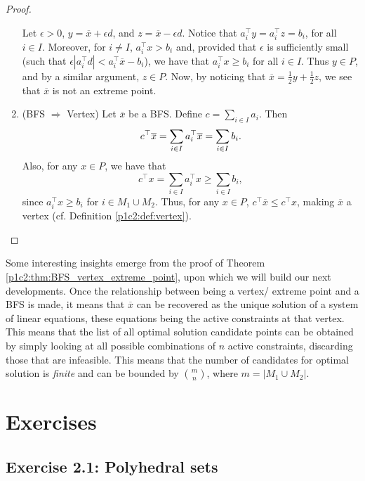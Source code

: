\begin{proof}
\begin{enumerate}
			Let $\epsilon > 0$, $y = \overline{x} + \epsilon d$, and $z = \overline{x} - \epsilon d$. Notice that $a_i^\top y = a_i^\top z = b_i$, for all $i \in I$. Moreover, for $i \neq I$, $a_i^\top x > b_i$ and, provided that $\epsilon$ is sufficiently small (such that $\epsilon|a_i^\top d| < a_i ^\top \overline{x} - b_i $), we have that $a_i ^\top x \geq b_i$ for all $i \in I$. Thus $y \in P$, and by a similar argument, $z \in P$. Now, by noticing that $\overline{x} = \frac{1}{2}y + \frac{1}{2}z$, we see that $\overline{x}$ is not an extreme point. 			 
		\item (BFS $\Rightarrow$ Vertex) Let $\overline{x}$ be a BFS. Define $c = \sum_{i \in I} a_i$. Then
			\begin{equation*}
				c^\top \overline{x} = \linebreak \sum_{i \in I} a_i^\top \overline{x} = \sum_{i \in I} b_i.	 			 	
	 		\end{equation*}
			Also, for any $x \in P$, we have that 
			\begin{equation*}
				c^\top x = \sum_{i \in I} a_i^\top x \geq \sum_{i \in I} b_i, 	 	
	 		\end{equation*}
	 		since $a_i^\top x \geq b_i$ for $i \in M_1 \cup M_2$. Thus, for any $x \in P$, $c^\top \overline{x} \leq c^\top x$, making $\overline{x}$ a vertex (cf. Definition \ref{p1c2:def:vertex}). \qedhere
	\end{enumerate} 	
\end{proof}

Some interesting insights emerge from the proof of Theorem \ref{p1c2:thm:BFS_vertex_extreme_point}, upon which we will build our next developments. Once the relationship between being a vertex/ extreme point and a BFS is made, it means that $\overline{x}$ can be recovered as the unique solution of a system of linear equations, these equations being the active constraints at that vertex. This means that the list of all optimal solution candidate points can be obtained by simply looking at all possible combinations of $n$ active constraints, discarding those that are infeasible. This means that the number of candidates for optimal solution is \emph{finite} and can be bounded by $\binom{m}{n}$, where $m=| M_1 \cup M_2 |$. 

\vfill
\pagebreak
\section{Exercises}

\subsection*{Exercise 2.1: Polyhedral sets \cite{bertsimas1997introduction}}



